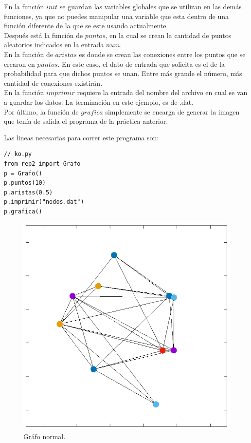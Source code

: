 \documentclass{article}%
\begin{document}
En la funci\'on $init$ se guardan las variables globales que se utilizan en las dem\'as funciones, ya que no puedes manipular una variable que esta dentro de una funci\'on diferente de la que se este usando actualmente.
\\

Despu\'es est\'a la funci\'on de $puntos$, en la cual se crean la cantidad de puntos aleatorios indicados en la entrada $num$.
\\

En la funci\'on de $aristas$ es donde se crean las conexiones entre los puntos que se crearon en $puntos$. En este caso, el dato de entrada que solicita es el de la probabilidad para que dichos puntos se unan. Entre m\'as grande el n\'umero, m\'as cantidad de conexiones existir\'an.
\\

En la funci\'on $imprimir$ requiere la entrada del nombre del archivo en cual se van a guardar los datos. La terminaci\'on en este ejemplo, es de .dat.
\\

Por \'ultimo, la funci\'on de $grafica$ simplemente se encarga de generar la imagen que ten\'ia de salida el programa de la pr\'actica anterior.

Las lineas necesarias para correr este programa son:

\begin{lstlisting}
// ko.py
from rep2 import Grafo
p = Grafo()
p.puntos(10)
p.aristas(0.5)
p.imprimir("nodos.dat")
p.grafica()
\end{lstlisting}

\begin{figure}[h]

\centering
\includegraphics[width = 1\textwidth]{nodos1.eps}
\caption{Gr\'afo normal.}
\end{figure}
\end{document}
